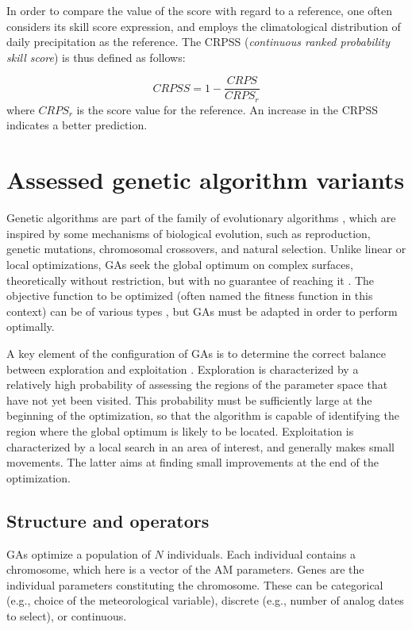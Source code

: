 \documentclass{ametsoc}
\begin{document}
In order to compare the value of the score with regard to a reference, one often considers its skill score expression, and employs the climatological distribution of daily precipitation as the reference. The CRPSS (\textit{continuous ranked probability skill score}) is thus defined as follows:

\begin{equation}
\label{eq:CRPSS}
CRPSS = 1-\frac{CRPS}{CRPS_{r}}
\end{equation}
where $CRPS_{r}$ is the score value for the reference. An increase in the CRPSS indicates a better prediction.


\section{Assessed genetic algorithm variants}
\label{sec:gas}

Genetic algorithms \citep[GAs,][]{Holland1992b, Goldberg1989} are part of the family of evolutionary algorithms \citep{Back1993b, Schwefel1993}, which are inspired by some mechanisms of biological evolution, such as reproduction, genetic mutations, chromosomal crossovers, and natural selection. Unlike linear or local optimizations, GAs seek the global optimum on complex surfaces, theoretically without restriction, but with no guarantee of reaching it \citep{Haupt2004}. The objective function to be optimized (often named the fitness function in this context) can be of various types \citep{Joines1996a}, but GAs must be adapted in order to perform optimally.

A key element of the configuration of GAs is to determine the correct balance between exploration and exploitation \citep{Back1992a, Smith1997a}. Exploration is characterized by a relatively high probability of assessing the regions of the parameter space that have not yet been visited. This probability must be sufficiently large at the beginning of the optimization, so that the algorithm is capable of identifying the region where the global optimum is likely to be located. Exploitation is characterized by a local search in an area of interest, and generally makes small movements. The latter aims at finding small improvements at the end of the optimization.


\subsection{Structure and operators}
\label{sec:gas:operators}

GAs optimize a population of $N$ individuals. Each individual contains a chromosome, which here is a vector of the AM parameters. Genes are the individual parameters constituting the chromosome. These can be categorical (e.g., choice of the meteorological variable), discrete (e.g., number of analog dates to select), or continuous.
\end{document}
